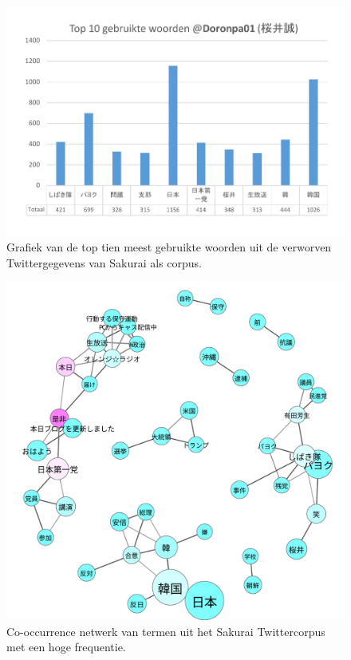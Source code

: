 \documentclass[10.5pt,dutch,]{article}
\begin{document}
\begin{figure}
  \centering
    \includegraphics[width=.8\textwidth]{images/frequency.pdf}
    \centering\caption{Grafiek van de top tien meest gebruikte woorden uit de verworven Twittergegevens van Sakurai als corpus.}
\end{figure}

\begin{figure}
  \centering
    \includegraphics{images/co-occurance_network.pdf}
    \centering\caption{Co-occurrence netwerk van termen uit het Sakurai Twittercorpus met een hoge frequentie.}
\end{figure}
\end{document}
